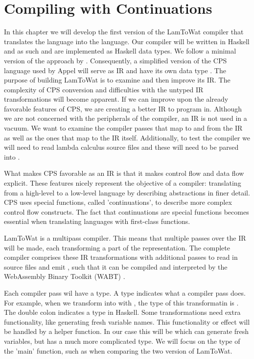 
\chapter{\label{chap:cpscomp}Compiling with Continuations}

In this chapter we will develop the first version of the LamToWat compiler that translates the  language into the  language. Our compiler will be written in Haskell \autocite{haskellhomepage} and as such  and  are implemented as Haskell data types. We follow a minimal version of the approach by \citeauthor{DBLP:books/daglib/0022396} \autocite{DBLP:books/daglib/0022396}. Consequently, a simplified version of the CPS language used by Appel will serve as IR and have its own data type . The purpose of building LamToWat is to examine and then improve its IR. The complexity of CPS conversion and difficulties with the untyped IR transformations will become apparent. If we can improve upon the already favorable features of CPS, we are creating a better IR to program in. Although we are not concerned with the peripherals of the compiler, an IR is not used in a vacuum. We want to examine the compiler passes that map to and from the IR as well as the ones that map to the IR itself. Additionally, to test the compiler we will need to read lambda calculus source files and these will need to be parsed into .

What makes CPS favorable as an IR is that it makes control flow and data flow explicit. These features nicely represent the objective of a compiler: translating from a high-level to a low-level language by describing abstractions in finer detail. CPS uses special functions, called 'continuations', to describe more complex control flow constructs. The fact that continuations are special functions becomes essential when translating languages with first-class functions.

LamToWat is a multipass compiler. This means that multiple passes over the IR will be made, each transforming a part of the representation. The complete compiler comprises these IR transformations with additional passes to read in source files and emit , such that it can be compiled and interpreted by the WebAssembly Binary Toolkit (WABT) \autocite{wabt}.

Each compiler pass wil have a type. A type indicates what a compiler pass does. For example, when we transform  into  with , the type of this transformatin is . The double colon indicates a type in Haskell. Some transformations need extra functionality, like generating fresh variable names. This functionality or effect will be handled by a helper function. In our case this will be  which can generate fresh variables, but has a much more complicated type. We will focus on the type of the 'main' function, such as  when comparing the two version of LamToWat.

